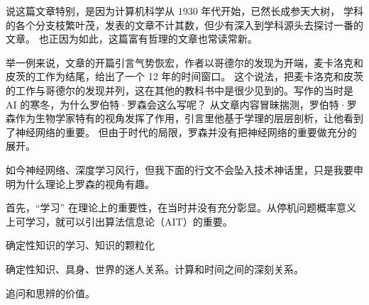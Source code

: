 \documentclass[a4paper,12pt]{article}
\begin{document}
说这篇文章特别，是因为计算机科学从 1930 年代开始，已然长成参天大树，
学科的各个分支枝繁叶茂，发表的文章不计其数，但少有深入到学科源头去探讨一番的文章。
也正因为如此，这篇富有哲理的文章也常读常新。

举一例来说，文章的开篇引言气势恢宏，作者以哥德尔的发现为开端，麦卡洛克和皮茨的工作为结尾，给出了一个 12 年的时间窗口。
这个说法，把麦卡洛克和皮茨的工作与哥德尔的发现并列，这在其他的教科书中是很少见到的。写作的当时是 AI 的寒冬，为什么罗伯特·罗森会这么写呢？
从文章内容冒昧揣测，罗伯特·罗森作为生物学家特有的视角发挥了作用，引言里他基于学理的层层剖析，让他看到了神经网络的重要。
但由于时代的局限，罗森并没有把神经网络的重要做充分的展开。

如今神经网络、深度学习风行，但我下面的行文不会坠入技术神话里，只是我要申明为什么理论上罗森的视角有趣。

首先，“学习” 在理论上的重要性，在当时并没有充分彰显。从停机问题概率意义上可学习，就可以引出算法信息论（AIT）的重要。

确定性知识的学习、知识的颗粒化

确定性知识、具身、世界的迷人关系。计算和时间之间的深刻关系。

追问和思辨的价值。
\end{document}
